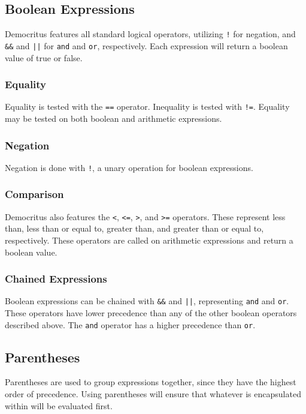 	\subsection{Boolean Expressions}
		Democritus features all standard logical operators, utilizing \texttt{!} for negation, and \verb|&&| and \verb^||^ for \texttt{and} and \texttt{or}, respectively. Each expression will return a boolean value of true or false.

    \subsubsection{Equality}
            Equality is tested with the \texttt{==} operator. Inequality is tested with \texttt{!=}. Equality may be tested on both boolean and arithmetic expressions. 
			
		\subsubsection{Negation}
			Negation is done with \texttt{!}, a unary operation for boolean expressions. 

    \subsubsection{Comparison}
      Democritus also features the \verb|<|, \verb|<=|, \verb|>|, and \verb|>=| operators. These represent less than, less than or equal to, greater than, and greater than or equal to, respectively. These operators are called on arithmetic expressions and return a boolean value. 
            

      \subsubsection{Chained Expressions}
            Boolean expressions can be chained with \verb|&&| and \verb!||!, representing \texttt{and} and \texttt{or}. These operators have lower precedence than any of the other boolean operators described above. The \texttt{and} operator has a higher precedence than \texttt{or}.

  \subsection{Parentheses}
    Parentheses are used to group expressions together, since they have the highest order of precedence. Using parentheses will ensure that whatever is encapsulated within will be evaluated first.

